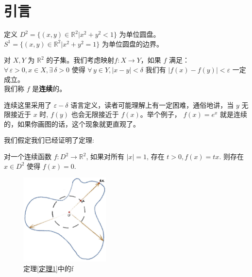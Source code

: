 \section{引言}
定义 $ D^2=\{(x,y)\in\mathbb{R}^2|x^2+y^2<1\} $ 为单位圆盘。 $ S^1=\{(x,y)\in\mathbb{R}^2|x^2+y^2=1\} $ 为单位圆盘的边界。 
\begin{definition}
    对 $ X,Y  $ 为 $ \mathbb{R}^2 $ 的子集。我们考虑映射$ f:X\rightarrow Y $，如果 $ f  $ 满足：\\ $ \forall \,\varepsilon>0,x\in 
    X,\exists\, \delta>0  $ 使得  $ \forall \,y\in Y,|x-y|<\delta  $ 我们有 $  |f(x)-f(y)|<\varepsilon $ 一定成立。\\我们称 $ f  $ 是\textbf{连续}的。
\end{definition}
\begin{remark}
    连续这里采用了 $ \varepsilon-\delta  $ 语言定义，读者可能理解上有一定困难，通俗地讲，当 $ y $ 无限接近于 $ x $ 时, $ f(y) $ 也会无限接近于 $ f(x) $。举个例子， $ f(x)=e^x  $ 就是连续的，如果你画图的话，这个现象就更直观了。 
\end{remark}
我们假定我们已经证明了定理:
\begin{theorem}[二维空间的零点存在定理]\label{定理1}
    对一个连续函数 $ f:D^2\rightarrow \mathbb{R}^2  $, 如果对所有 $ |x|=1 $, 存在 $ t>0,f(x)=tx $. 则存在 $ x\in D^2 $ 使得 $ f(x)=0 $. 
\end{theorem}


\begin{figure}[htb]
    \centering
    \includegraphics[width=0.4\textwidth]{拓扑学-课本.jpg}
    \caption{定理\ref{定理1}中的f}
    \label{定理中的f}
\end{figure}

